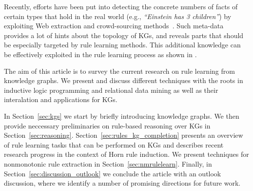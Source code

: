 Recently, efforts have been put into detecting the concrete numbers of 
facts of certain types that hold in the real world 
(e.g., \emph{``Einstein has 3 children''}) by exploiting Web extraction and crowd-sourcing methods~\cite{cardinality-extraction-iswc-2016,cool-wd}. Such 
meta-data provides a lot of hints about the topology of KGs, and reveals 
parts that should be especially targeted by rule learning methods.
This additional knowledge can be effectively exploited in the rule learning process as shown in \cite{carl}.



The aim of this article is to survey the current research on rule learning from knowledge graphs. We present and discuss different techniques with the roots in inductive logic programming and relational data mining as well as their interalation and applications for KGs. 

In Section~\ref{sec:kgs} we start by briefly introducing knowledge graphs. We then provide neccessary preliminaries on rule-based reasoning over KGs in Section~\ref{sec:reasoning}. Section~\ref{sec:rules_kg_completion} presents an overview of rule learning tasks that can be performed on KGs and describes recent research progress in the context of Horn rule induction. We present techniques for nonmonotonic rule extraction in Section~\ref{sec:nmrulelearn}. Finally, in Section~\ref{sec:discussion_outlook} we conclude the article with an outlook discussion, where we identify a number of promising directions for future work.


